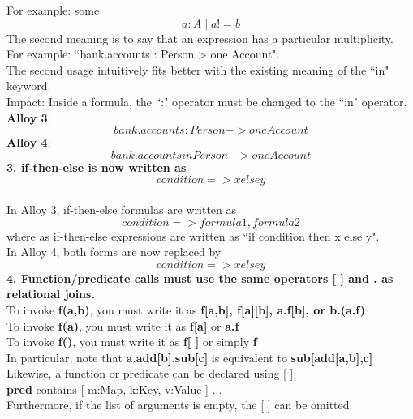 \documentclass[a4paper,12pt]{extarticle}
\begin{document}
For example: some \begin{equation}
 a:A \mid a!=b
\end{equation}
The second meaning is to say that an expression has a particular multiplicity.\\
For example: ``bank.accounts : Person \-> one Account".\\
The second usage intuitively fits better with the existing meaning of the ``in" keyword. \\
Impact: Inside a formula, the ``:" operator must be changed to the ``in" operator. \\

\textbf{Alloy 3}:     \begin{equation}
bank.accounts : Person -> one Account
\end{equation}  
\textbf{Alloy 4}:    \begin{equation}
bank.accounts in Person ->  one Account 
\end{equation} 
\textbf{3. if-then-else is now written as \begin{equation}
condition => x else y
\end{equation} } \\
In Alloy 3, if-then-else formulas are written as \begin{equation} condition => formula1,formula2 \end{equation} where as if-then-else expressions are written as ``if condition then x else y". \\
In Alloy 4, both forms are now replaced by \begin{equation} condition => x else y \end{equation}
\textbf{4. Function/predicate calls must use the same operators [ ] and . as relational joins. } \\
To invoke \textbf{f(a,b)}, you must write it as \textbf{f[a,b], f[a][b], a.f[b], or b.(a.f)} \\ 
To invoke \textbf{f(a)}, you must write it as \textbf{f[a]} or \textbf{a.f} \\
To invoke \textbf{f()}, you must write it as \textbf{f[ ]} or simply \textbf{f} \\
In particular, note that \textbf{a.add[b].sub[c]} is equivalent to \textbf{sub[add[a,b],c]} \\
Likewise, a function or predicate can be declared using [ ]: \\
    \textbf{pred} contains [ m:Map, k:Key, v:Value ] {...} \\
Furthermore, if the list of arguments is empty, the [ ] can be omitted:\\
\end{document}
